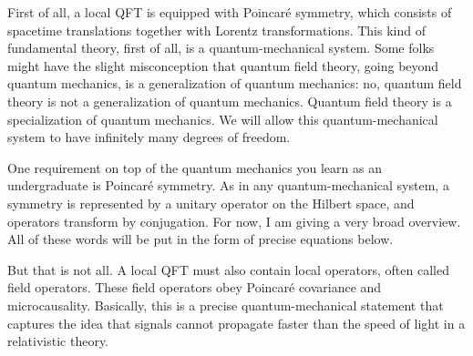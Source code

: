 First of all, a local QFT is equipped with Poincaré symmetry, which consists of
spacetime translations together with Lorentz transformations.
This kind of fundamental theory, first of all, is a quantum-mechanical system.
Some folks might have the slight misconception that quantum field theory, going
beyond quantum mechanics, is a generalization of quantum mechanics: no, quantum
field theory is not a generalization of quantum mechanics. Quantum field theory
is a specialization of quantum mechanics.
We will allow this quantum-mechanical system to have infinitely many degrees of
freedom.

One requirement on top of the quantum mechanics you learn as an undergraduate
is Poincaré symmetry.
As in any quantum-mechanical system, a symmetry is represented by a unitary
operator on the Hilbert space, and operators transform by conjugation.
For now, I am giving a very broad overview. All of these words will be put in
the form of precise equations below.

But that is not all. A local QFT must also contain local operators, often called
field operators.
These field operators obey Poincaré covariance and microcausality.
Basically, this is a precise quantum-mechanical statement that captures the idea
that signals cannot propagate faster than the speed of light in a relativistic
theory.

